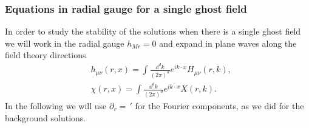 \subsubsection{Equations in radial gauge for a single ghost field}

In order to study the stability of the solutions when there is a single ghost field we will work in the radial gauge $h_{M r}=0$ and expand in plane waves along the field theory directions
\begin{equation}
\begin{split}
	&h_{\mu\nu}(r,x)=\int \frac{\dd^dk}{(2\pi)^d} e^{ik\cdot x}H_{\mu\nu}(r,k),\\
	&\chi(r,x)=\int \frac{\dd^dk}{(2\pi)^d} e^{ik\cdot x}X(r,k).
\end{split}
\end{equation}
In the following we will use $\partial_r=\,'$ for the Fourier components, as we did for the background solutions. 

